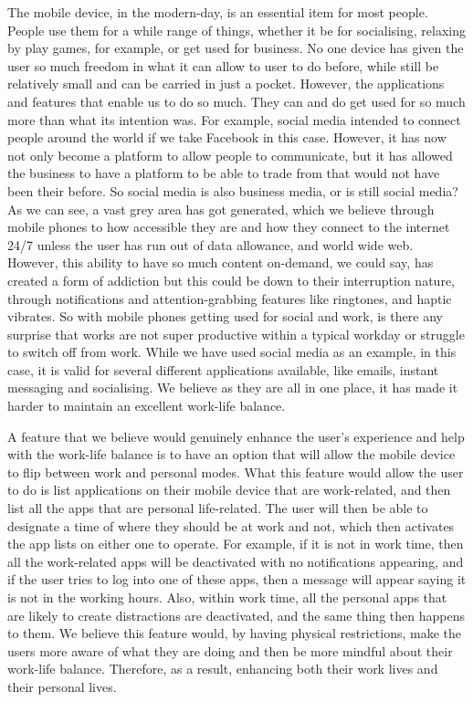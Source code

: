 \documentclass{sigchi}
\begin{document}
		The mobile device, in the modern-day, is an essential item for most people. People use them for a while range of things, whether it be for socialising, relaxing by play games, for example, or get used for business. No one device has given the user so much freedom in what it can allow to user to do before, while still be relatively small and can be carried in just a pocket. However, the applications and features that enable us to do so much. They can and do get used for so much more than what its intention was. For example, social media intended to connect people around the world if we take Facebook in this case. However, it has now not only become a platform to allow people to communicate, but it has allowed the business to have a platform to be able to trade from that would not have been their before. So social media is also business media, or is still social media? As we can see, a vast grey area has got generated, which we believe through mobile phones to how accessible they are and how they connect to the internet 24/7 unless the user has run out of data allowance, and world wide web. However, this ability to have so much content on-demand, we could say, has created a form of addiction but this could be down to their interruption nature, through notifications and attention-grabbing features like ringtones, and haptic vibrates. So with mobile phones getting used for social and work, is there any surprise that works are not super productive within a typical workday or struggle to switch off from work. While we have used social media as an example, in this case, it is valid for several different applications available, like emails, instant messaging and socialising. We believe as they are all in one place, it has made it harder to maintain an excellent work-life balance.
		
		A feature that we believe would genuinely enhance the user's experience and help with the work-life balance is to have an option that will allow the mobile device to flip between work and personal modes. What this feature would allow the user to do is list applications on their mobile device that are work-related, and then list all the apps that are personal life-related. The user will then be able to designate a time of where they should be at work and not, which then activates the app lists on either one to operate. For example, if it is not in work time, then all the work-related apps will be deactivated with no notifications appearing, and if the user tries to log into one of these apps, then a message will appear saying it is not in the working hours. Also, within work time, all the personal apps that are likely to create distractions are deactivated, and the same thing then happens to them. We believe this feature would, by having physical restrictions, make the users more aware of what they are doing and then be more mindful about their work-life balance. Therefore, as a result, enhancing both their work lives and their personal lives.
		
\end{document}
